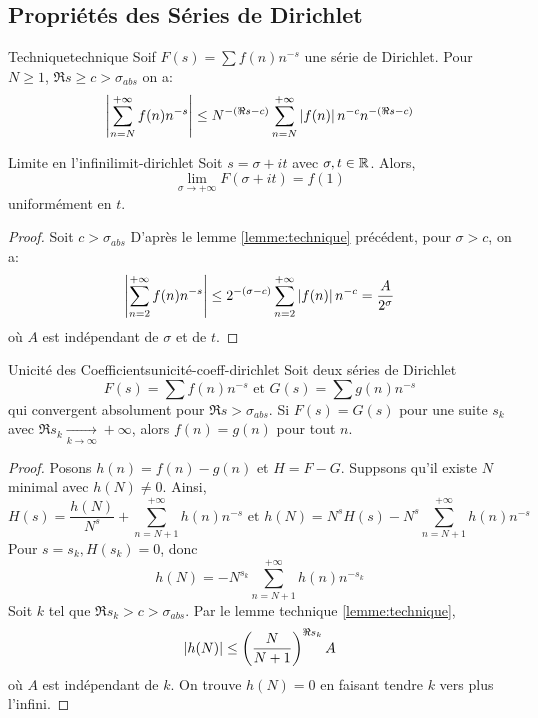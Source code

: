 \documentclass{cours}
\begin{document}
\subsection{Propriétés des Séries de Dirichlet}
\begin{lemme}
	{Technique}{technique}
	Soif $F(s) = \sum f(n) n^{-s}$ une série de Dirichlet. Pour $N \geq 1$, $\Re s \geq c > \sigma_{abs}$ on a: 
	\begin{equation*}
	\left|\sum_{n = N}^{+ \infty} f(n) n^{-s}\right| \leq N^{-(\Re s - c)}\sum_{n = N}^{+\infty}\left|f(n)\right|n^{-c}n^{-(\Re s - c)}
	\end{equation*}
\end{lemme}

\begin{théorème}
	{Limite en l'infini}{limit-dirichlet}	
	Soit $s = \sigma + it$ avec $\sigma, t \in \mathbb{R}$. Alors, 
	\begin{equation*}
		\lim_{\sigma \to + \infty} F(\sigma + it) = f(1)
	\end{equation*}
	uniformément en $t$. 
\end{théorème}

\begin{proof}
	Soit $c > \sigma_{abs}$ D'après le lemme \ref{lemme:technique} précédent, pour $\sigma > c$, on a: 
	\begin{equation*}
		\left|\sum_{n = 2}^{+ \infty} f(n)n^{-s}\right| \leq 2^{-(\sigma - c)}\sum_{n = 2}^{+\infty}\left|f(n)\right|n^{-c} = \frac{A}{2^{\sigma}}
	\end{equation*}
	où $A$ est indépendant de $\sigma$ et de $t$. 
\end{proof}


\begin{théorème}
	{Unicité des Coefficients}{unicité-coeff-dirichlet}
	Soit deux séries de Dirichlet 
	\begin{equation*}
		F(s) = \sum f(n)n^{-s} \text{ et } G(s) = \sum g(n)n^{-s}
	\end{equation*}
	qui convergent absolument pour $\Re s > \sigma_{abs}$. Si $F(s) = G(s)$ pour une suite $s_{k}$ avec $\Re s_{k} \xrightarrow[k \to \infty]{} + \infty$, alors $f(n) = g(n)$ pour tout $n$. 
\end{théorème}
\begin{proof}
	Posons $h(n) = f(n) - g(n)$ et $H = F - G$. Suppsons qu'il existe $N$ minimal avec $h(N) \neq 0$. Ainsi, 
	\begin{equation*}
		H(s) = \frac{h(N)}{N^{s}} + \sum_{n = N + 1}^{+\infty}h(n)n^{-s} \text{ et } h(N) = N^{s}H(s) - N^{s}\sum_{n = N + 1}^{+ \infty}h(n)n^{-s}
	\end{equation*}
	Pour $s = s_{k}, H(s_{k}) = 0$, donc
	\begin{equation*}
		h(N) = -N^{s_{k}}\sum_{n = N + 1}^{+\infty}h(n)n^{-s_{k}}
	\end{equation*}
	Soit $k$ tel que $\Re s_{k} > c > \sigma_{abs}$. Par le lemme technique \ref{lemme:technique}, 
	\begin{equation*}
		\left|h(N)\right| \leq \left(\frac{N}{N + 1}\right)^{\Re s_{k}} A
	\end{equation*}
	où $A$ est indépendant de $k$. On trouve $h(N) = 0$ en faisant tendre $k$ vers plus l'infini. 
\end{proof}
\end{document}
